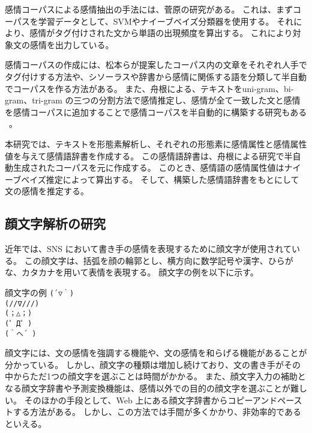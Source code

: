 \documentclass[11pt,a4j]{jsarticle}
\begin{document}
\begin{comment}
感情属性のほかに感情属性値と感情パラメータが付与されている。
この感情属性値とは、単語がその感情属性にどれだけ帰属するかの度合いを表す。
感情パラメータとは、文中の各要素に付与された感情属性値を感情の種類ごとに合成したものを指す。
感情パラメータは、$(各感情属性の数) * (文中の格要素数 +1)$ の感情ベクトルで表現する。
\end{comment}

感情コーパスによる感情抽出の手法には、菅原の研究がある。
これは、まずコーパスを学習データとして、SVMやナイーブベイズ分類器を使用する。
それにより、感情がタグ付けされた文から単語の出現頻度を算出する。
これにより対象文の感情を出力している。

感情コーパスの作成には、松本らが提案したコーパス内の文章をそれぞれ人手でタグ付けする方法や、シソーラスや辞書から感情に関係する語を分類して半自動でコーパスを作る方法がある。
また、舟根による、テキストをuni-gram、bi-gram、tri-gram の三つの分割方法で感情推定し、感情が全て一致した文と感情を感情コーパスに追加することで感情コーパスを半自動的に構築する研究もある ~。

本研究では、テキストを形態素解析し、それぞれの形態素に感情属性と感情属性値を与えて感情語辞書を作成する。
この感情語辞書は、舟根による研究で半自動生成されたコーパスを元に作成する。
このとき、感情語の感情属性値はナイーブベイズ推定によって算出する。
そして、構築した感情語辞書をもとにして文の感情を推定する。

\subsection{顔文字解析の研究}\label{sec:kaomojichushutsu}
近年では、SNS において書き手の感情を表現するために顔文字が使用されている。
この顔文字は、括弧を顔の輪郭とし、横方向に数学記号や漢字、ひらがな、カタカナを用いて表情を表現する。
顔文字の例を以下に示す。

\begin{itembox}[c]{顔文字の例}
  \verb|(´▽｀)| \\
  \verb|(//∇///)| \\
  \verb|(；△；)| \\
  \verb|(゜Д゜)| \\
  \verb|(｀へ´ )| \\
\end{itembox}

顔文字には、文の感情を強調する機能や、文の感情を和らげる機能があることが分かっている。
しかし、顔文字の種類は増加し続けており、文の書き手がその中からただ1つの顔文字を選ぶことは時間がかかる。
また、顔文字入力の補助となる顔文字辞書や予測変換機能は、感情以外での目的の顔文字を選ぶことが難しい。
そのほかの手段として、Web 上にある顔文字辞書からコピーアンドペーストする方法がある。
しかし、この方法では手間が多くかかり、非効率的であるといえる。
\end{document}
